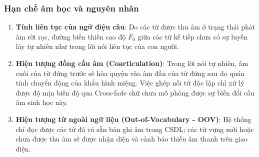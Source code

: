 \subsubsection{Hạn chế âm học và nguyên nhân}
\begin{enumerate}
    \item \textbf{Tính liên tục của ngữ điệu câu}: Do các từ được thu âm ở trạng thái phát âm rời rạc, đường biến thiên cao độ $F_0$ giữa các từ kế tiếp chưa có sự luyến láy tự nhiên như trong lời nói liên tục của con người.
    \item \textbf{Hiện tượng đồng cấu âm (Coarticulation)}: Trong lời nói tự nhiên, âm cuối của từ đứng trước sẽ hòa quyện vào âm đầu của từ đứng sau do quán tính chuyển động của khẩu hình miệng. Việc ghép nối từ độc lập chỉ xử lý được độ mịn biên độ qua Cross-fade chứ chưa mô phỏng được sự biến đổi cấu âm sinh học này.
    \item \textbf{Hiện tượng từ ngoài ngữ liệu (Out-of-Vocabulary - OOV)}: Hệ thống chỉ đọc được các từ đã có sẵn bản ghi âm trong CSDL; các từ vựng mới hoặc chưa được thu âm sẽ được nhận diện và cảnh báo thiếu âm thanh trên giao diện.
\end{enumerate}
